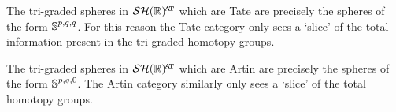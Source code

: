 \begin{rmk}
  The tri-graded spheres in $\SHR^{\at}$ which are Tate are precisely the spheres of the form $\operatorname{\mathbb{S}}^{p,q,q}$.
  For this reason the Tate category only sees a `slice' of the total information present in the tri-graded homotopy groups.

  The tri-graded spheres in $\SHR^{\at}$ which are Artin are precisely the spheres of the form $\operatorname{\mathbb{S}}^{p,q,0}$.
  The Artin category similarly only sees a `slice' of the total homotopy groups.

\end{rmk}









